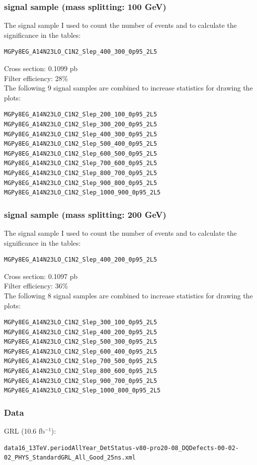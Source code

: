 \documentclass[mathserif,serif]{beamer}
\begin{document}
\begin{frame}[fragile]
\frametitle{signal sample (mass splitting: 100 GeV)}
\small
The signal sample I used to count the number of events and to calculate the significance in the tables:
\tiny
\begin{verbatim}
MGPy8EG_A14N23LO_C1N2_Slep_400_300_0p95_2L5
\end{verbatim}
\small
Cross section: 0.1099 pb \\
Filter efficiency: 28\% \\
\vspace{5mm}
The following 9 signal samples are combined to increase statistics for drawing the plots:
\tiny
\begin{verbatim}
MGPy8EG_A14N23LO_C1N2_Slep_200_100_0p95_2L5
MGPy8EG_A14N23LO_C1N2_Slep_300_200_0p95_2L5
MGPy8EG_A14N23LO_C1N2_Slep_400_300_0p95_2L5
MGPy8EG_A14N23LO_C1N2_Slep_500_400_0p95_2L5
MGPy8EG_A14N23LO_C1N2_Slep_600_500_0p95_2L5
MGPy8EG_A14N23LO_C1N2_Slep_700_600_0p95_2L5
MGPy8EG_A14N23LO_C1N2_Slep_800_700_0p95_2L5
MGPy8EG_A14N23LO_C1N2_Slep_900_800_0p95_2L5
MGPy8EG_A14N23LO_C1N2_Slep_1000_900_0p95_2L5
\end{verbatim}
\end{frame}

\begin{frame}[fragile]
\frametitle{signal sample (mass splitting: 200 GeV)}
\small
The signal sample I used to count the number of events and to calculate the significance in the tables:
\tiny
\begin{verbatim}
MGPy8EG_A14N23LO_C1N2_Slep_400_200_0p95_2L5
\end{verbatim}
\small
Cross section: 0.1097 pb \\
Filter efficiency: 36\% \\
\vspace{5mm}
The following 8 signal samples are combined to increase statistics for drawing the plots:
\tiny
\begin{verbatim}
MGPy8EG_A14N23LO_C1N2_Slep_300_100_0p95_2L5
MGPy8EG_A14N23LO_C1N2_Slep_400_200_0p95_2L5
MGPy8EG_A14N23LO_C1N2_Slep_500_300_0p95_2L5
MGPy8EG_A14N23LO_C1N2_Slep_600_400_0p95_2L5
MGPy8EG_A14N23LO_C1N2_Slep_700_500_0p95_2L5
MGPy8EG_A14N23LO_C1N2_Slep_800_600_0p95_2L5
MGPy8EG_A14N23LO_C1N2_Slep_900_700_0p95_2L5
MGPy8EG_A14N23LO_C1N2_Slep_1000_800_0p95_2L5
\end{verbatim}
\end{frame}

\begin{frame}[fragile]
\frametitle{Data}
\small
GRL (10.6 fb$^{-1}$):\\
\tiny
\begin{verbatim}
data16_13TeV.periodAllYear_DetStatus-v80-pro20-08_DQDefects-00-02-02_PHYS_StandardGRL_All_Good_25ns.xml
\end{verbatim}
\end{frame}
\end{document}
